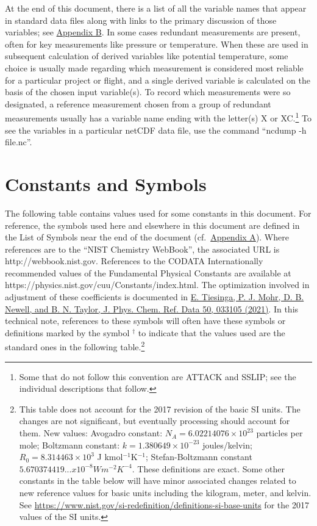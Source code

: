 \documentclass[
  english,
]{book}
\begin{document}
At the end of this document, there is a list of all the variable names
that appear in standard data files along with links to the primary
discussion of those variables; see
\href{./appendix-b-variable-names.html\#variable-names}{Appendix B}. In
some cases redundant measurements are present, often for key
measurements like pressure or temperature. When these are used in
subsequent calculation of derived variables like potential temperature,
some choice is usually made regarding which measurement is considered
most reliable for a particular project or flight, and a single derived
variable is calculated on the basis of the chosen input variable(s). To
record which measurements were so designated, a reference measurement
chosen from a group of redundant measurements usually has a variable
name ending with the letter(s) X or XC.\footnote{Some that do not follow
  this convention are ATTACK and SSLIP; see the individual descriptions
  that follow.} To see the variables in a particular netCDF data file,
use the command ``ncdump -h file.nc''.

\hypertarget{constants-and-symbols}{%
\section{Constants and Symbols}\label{constants-and-symbols}}

The following table contains values used for some constants in this
document. For reference, the symbols used here and elsewhere in this
document are defined in the List of Symbols near the end of the document
(cf.~\href{./appendix-a-list-of-symbols.html\#list-of-symbols}{Appendix
A}). Where references are to the ``NIST Chemistry WebBook'', the
associated URL is http://webbook.nist.gov. References to the CODATA
Internationally recommended values of the Fundamental Physical Constants
are available at https://physics.nist.gov/cuu/Constants/index.html. The
optimization involved in adjustment of these coefficients is documented
in \href{https://aip.scitation.org/doi/10.1063/5.0064853}{E. Tiesinga,
P. J. Mohr, D. B. Newell, and B. N. Taylor, J. Phys. Chem. Ref. Data 50,
033105 (2021)}. In this technical note, references to these symbols will
often have these symbols or definitions marked by the symbol
\(^\dagger\) to indicate that the values used are the standard ones in
the following table.\footnote{This table does not account for the 2017
  revision of the basic SI units. The changes are not significant, but
  eventually processing should account for them. New values: Avogadro
  constant: \(N_A=6.02214076\times 10^{23}\) particles per mole;
  Boltzmann constant: \(k=1.380649 × 10^{-23}\) joules/kelvin;
  \(R_0=8.314463\times 10^{3}\) J kmol\(^{-1}\)K\(^{-1}\);
  Stefan-Boltzmann constant
  \(5.670374419... x 10^{-8} W m^{-2} K^{-4}\). These definitions are
  exact. Some other constants in the table below will have minor
  associated changes related to new reference values for basic units
  including the kilogram, meter, and kelvin. See
  \url{https://www.nist.gov/si-redefinition/definitions-si-base-units}
  for the 2017 values of the SI units.}
\end{document}
